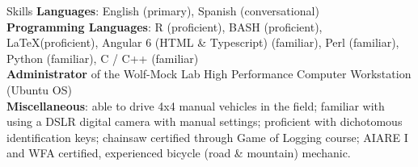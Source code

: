 \documentclass{resume} %
\begin{document}
\begin{rSection}{Skills}
\textbf{Languages}: English (primary), Spanish (conversational)
\\
\textbf{Programming Languages}: R (proficient), BASH (proficient), \LaTeX (proficient), Angular 6 (HTML \& Typescript) (familiar), Perl (familiar), Python (familiar), C / C++ (familiar)
\\
\textbf{Administrator} of the Wolf-Mock Lab High Performance Computer Workstation (Ubuntu OS)
\\
\textbf{Miscellaneous}: able to drive 4x4 manual vehicles in the field; familiar with using a DSLR digital camera with manual settings; proficient with dichotomous identification keys; chainsaw certified through Game of Logging course; AIARE I and WFA certified, experienced bicycle (road \& mountain) mechanic. 
\end{rSection}
\end{document}
